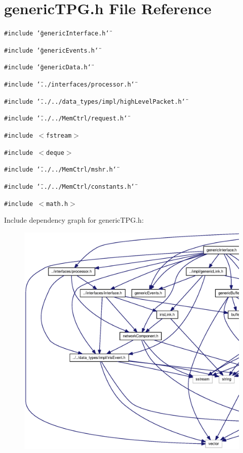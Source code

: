 \section{genericTPG.h File Reference}
\label{genericTPG_8h}
{\tt \#include \char`\"{}genericInterface.h\char`\"{}}\par
{\tt \#include \char`\"{}genericEvents.h\char`\"{}}\par
{\tt \#include \char`\"{}genericData.h\char`\"{}}\par
{\tt \#include \char`\"{}../interfaces/processor.h\char`\"{}}\par
{\tt \#include \char`\"{}../../data\_\-types/impl/highLevelPacket.h\char`\"{}}\par
{\tt \#include \char`\"{}../../MemCtrl/request.h\char`\"{}}\par
{\tt \#include $<$fstream$>$}\par
{\tt \#include $<$deque$>$}\par
{\tt \#include \char`\"{}../../MemCtrl/mshr.h\char`\"{}}\par
{\tt \#include \char`\"{}../../MemCtrl/constants.h\char`\"{}}\par
{\tt \#include $<$math.h$>$}\par


Include dependency graph for genericTPG.h:\nopagebreak
\begin{figure}[H]
\begin{center}
\leavevmode
\includegraphics[width=420pt]{genericTPG_8h__incl}
\end{center}
\end{figure}


